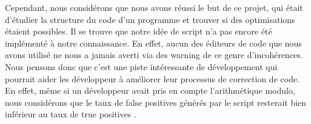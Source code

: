 Cependant, nous considérons que nous avons réussi le but de ce projet, qui était d'étudier la structure du code d'un programme et trouver si des optimisations étaient possibles. Il se trouve que notre idée de script n'a pas encore été implémenté à notre connaissance. En effet, aucun des éditeurs de code que nous avons utilisé ne nous a jamais averti via des warning de ce genre d'incohérences. Nous pensons donc que c'est une piste intéressante de développement qui pourrait aider les développeur à améliorer leur processus de correction de code. En effet, même si un développeur avait pris en compte l'arithmétique modulo, nous considérons que le taux de \og false positives \fg{} générés par le script resterait bien inférieur au taux de \og true positives \fg{}.